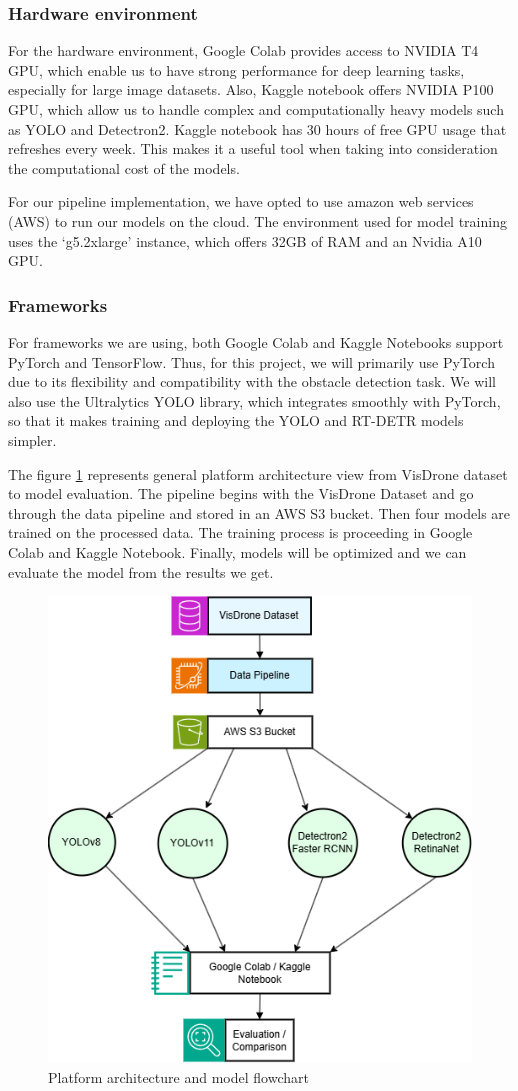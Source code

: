 \documentclass[stu,12pt,floatsintext]{apa7}
\begin{document}
\subsubsection{Hardware environment}
For the hardware environment, Google Colab provides access to NVIDIA T4 GPU, which enable us to have strong performance for deep learning tasks, especially for large image datasets. Also, Kaggle notebook offers NVIDIA P100 GPU, which allow us to handle complex and computationally heavy models such as YOLO and Detectron2. Kaggle notebook has 30 hours of free GPU usage that refreshes every week. This makes it a useful tool when taking into consideration the computational cost of the models.

For our pipeline implementation, we have opted to use amazon web services (AWS) to run our models on the cloud. The environment used for model training uses the `g5.2xlarge' instance, which offers 32GB of RAM and an Nvidia A10 GPU. 

\subsubsection{Frameworks}
For frameworks we are using, both Google Colab and Kaggle Notebooks support PyTorch and TensorFlow. Thus, for this project, we will primarily use PyTorch due to its flexibility and compatibility with the obstacle detection task. We will also use the Ultralytics YOLO library, which integrates smoothly with PyTorch, so that it makes training and deploying the YOLO and RT-DETR models simpler.


The figure \ref{fig:mlFlowchart} represents general platform architecture view from VisDrone dataset to model evaluation. The pipeline begins with the VisDrone Dataset and go through the data pipeline and stored in an AWS S3 bucket. Then four models are trained on the processed data. The training process is proceeding in Google Colab and Kaggle Notebook. Finally, models will be optimized and we can evaluate the model from the results we get.

\begin{figure}[!htb]
	\centering
	\includegraphics[width=0.6\linewidth]{images/modelsupportDiagram.png}
	\caption{Platform architecture and model flowchart}
	\label{fig:mlFlowchart}
\end{figure}
\end{document}
